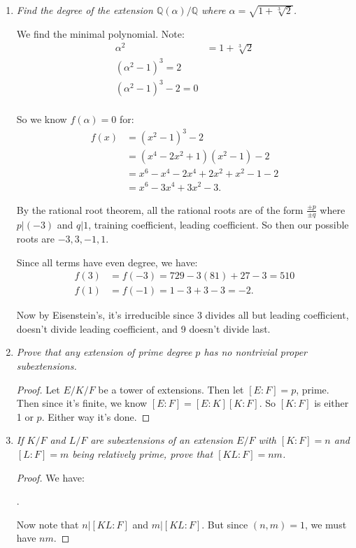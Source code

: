\documentclass[9pt,reqno,twoside]{amsbook}
\theoremstyle{plain}
\numberwithin{section}{chapter}
\numberwithin{equation}{chapter}
\theoremstyle{definition}
\theoremstyle{remark}
\theoremstyle{plain}
\newcommand{\Q}{\mathbb{Q}}
\newcommand{\bb}{\vspace{3mm}}
\newcommand{\bee}{\begin{equation}\begin{aligned}}
\newcommand{\eee}{\end{aligned}\end{equation}}
\newcommand{\fracc}{\frac}
\renewcommand{\leq}{\leqslant}
\begin{document}
\begin{enumerate}[label=\arabic*.]
\bb


\item \textit{Find the degree of the extension $\Q(\alpha)/\Q$ where $\alpha = \sqrt{1 + \sqrt[3]{2}}$. }

We find the minimal polynomial. Note:
\bee
\alpha^2 &= 1 + \sqrt[3]{2}\\
(\alpha^2  - 1)^3 = 2\\
(\alpha^2  - 1)^3 - 2 = 0\\
\eee

So we know $f(\alpha) = 0$ for:
\bee
f(x) &= (x^2 - 1)^3 - 2\\
&= (x^4 - 2x^2 + 1)(x^2 - 1) - 2\\
&= x^6 - x^4 - 2x^4 + 2x^2 + x^2 - 1 - 2\\
&= x^6 - 3x^4 + 3x^2 - 3.
\eee

By the rational root theorem, all the rational roots are of the form $\fracc{\pm p}{\pm q}$ where $p|(-3)$ and $q|1$, training coefficient, leading coefficient. So then our possible roots are $-3,3,-1,1$. 

Since all terms have even degree, we have:
\bee
f(3) &= f(-3) = 729 - 3(81) + 27 - 3 = 510\\
f(1) &= f(-1) = 1 - 3 + 3 - 3 = -2.
\eee

Now by Eisenstein's, it's irreducible since 3 divides all but leading coefficient, doesn't divide leading coefficient, and 9 doesn't divide last. 


\item \textit{Prove that any extension of prime degree $p$ has no nontrivial proper subextensions. }

\begin{proof}
Let $E/K/F$ be a tower of extensions. Then let $[E:F] = p$, prime. Then since it's finite, we know $[E:F] = [E:K][K:F]$. So $[K:F]$ is either 1 or $p$. Either way it's done. 
\end{proof}

\item \textit{If $K/F$ and $L/F$ are subextensions of an extension $E/F$ with $[K:F] = n$ and $[L:F] = m$ being relatively prime, prove that $[KL:F] = nm$. }

\begin{proof}
We have:
\begin{center}
.
\end{center}
Now note that $n|[KL:F]$ and $m|[KL:F]$. But since $(n,m) = 1$, we must have $nm$. 
\end{proof}


\end{enumerate}
\end{document}
